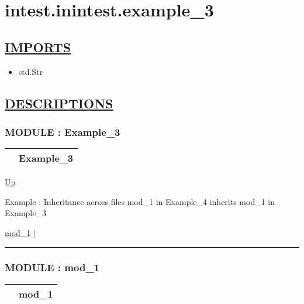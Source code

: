 \chapter*{intest.inintest.example\_3}
\hypertarget{ecldoc:toc:intest.inintest.example_3}{}

\section*{\underline{IMPORTS}}
\begin{itemize}
\item std.Str
\end{itemize}

\section*{\underline{DESCRIPTIONS}}
\subsection*{MODULE : Example\_3}
\hypertarget{ecldoc:intest.inintest.Example_3}{}

{\renewcommand{\arraystretch}{1.5}
\begin{tabularx}{\textwidth}{|>{\raggedright\arraybackslash}l|X|}
\hline
\hspace{0pt} & Example\_3 \\
\hline
\end{tabularx}
}

\hyperlink{ecldoc:toc:intest/inintest}{Up}

\par
Example : Inheritance across files mod\_1 in Example\_4 inherits mod\_1 in Example\_3


\hyperlink{ecldoc:intest.inintest.Example_3.mod_1}{mod\_1}  |

\rule{\textwidth}{0.4pt}

\subsection*{MODULE : mod\_1}
\hypertarget{ecldoc:intest.inintest.Example_3.mod_1}{}

{\renewcommand{\arraystretch}{1.5}
\begin{tabularx}{\textwidth}{|>{\raggedright\arraybackslash}l|X|}
\hline
\hspace{0pt} & mod\_1 \\
\hline
\end{tabularx}
}

